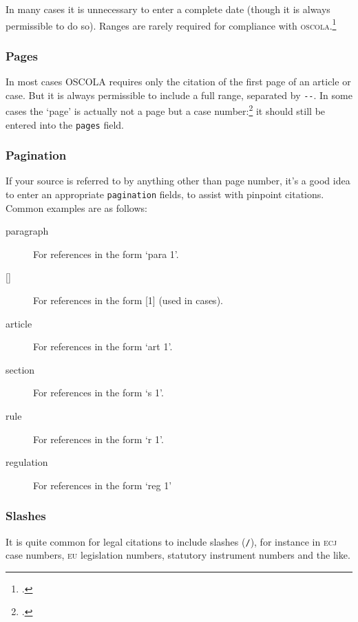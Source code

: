 \documentclass[a4paper,
               11pt,
	       DIV=1,			   
	       footinclude=false]
	      {scrartcl}
\newcommand{\oscolashort}{\textsc{oscola}\nocite{oscola}}
\begin{document}
In many cases it is unnecessary to enter a complete date (though it is
always permissible to do so). Ranges are rarely required for
compliance with \oscolashort.\footcite[They are needed only when referring
to sessions of Parliament: see][40]{oscola}

\subsubsection{Pages}

In most cases OSCOLA requires only the citation of the first page of
an article or case. But it is always permissible to include a full
range, separated by \verb|--|. In some cases the `page' is actually
not a page but a case number:\footcite[See, eg,][18]{oscola} it should
still be entered into the \texttt{pages} field.

\subsubsection{Pagination\label{pagination}}

If your source is referred to by anything other than page number, it's a good idea to enter an appropriate \texttt{pagination} fields, to assist with pinpoint citations. Common examples are as follows:
\begin{description}
\item[paragraph] For references in the form `para 1'.
\item[{[]}] For references in the form [1] (used in cases).
\item[article] For references in the form `art 1'.
\item[section] For references in the form `s 1'.
\item[rule] For references in the form `r 1'.
\item[regulation] For references in the form `reg 1'
\end{description}

\subsubsection{Slashes}

It is quite common for legal citations to include slashes
(\texttt{/}), for instance in \textsc{ecj} case numbers, \textsc{eu}
legislation numbers, statutory instrument numbers and the like.
\end{document}
